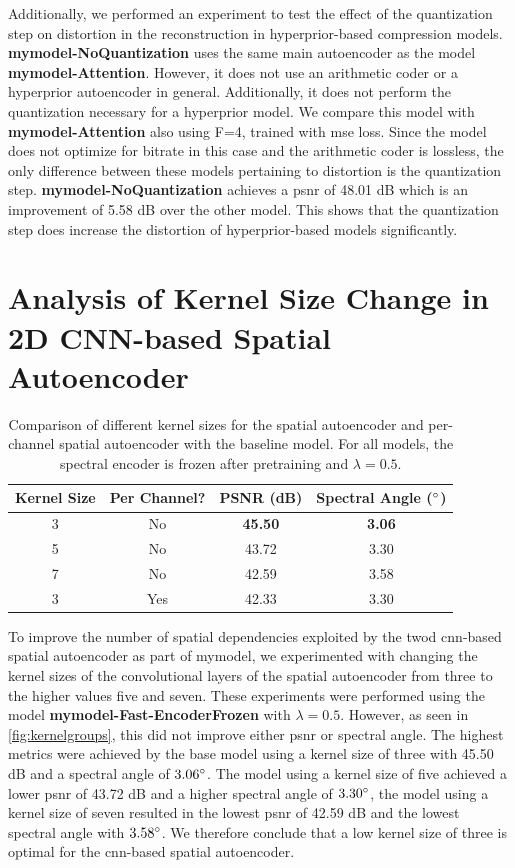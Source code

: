 Additionally, we performed an experiment to test the effect of the quantization step on distortion in the reconstruction in hyperprior-based compression models. \textbf{\ac{mymodel}-NoQuantization} uses the same main autoencoder as the model \textbf{\ac{mymodel}-Attention}. However, it does not use an arithmetic coder or a hyperprior autoencoder in general. Additionally, it does not perform the quantization necessary for a hyperprior model. We compare this model with \textbf{\ac{mymodel}-Attention} also using F=4, trained with \ac{mse} loss. Since the model does not optimize for bitrate in this case and the arithmetic coder is lossless, the only difference between these models pertaining to distortion is the quantization step. \textbf{\ac{mymodel}-NoQuantization} achieves a \ac{psnr} of 48.01 dB which is an improvement of 5.58 dB over the other model. This shows that the quantization step does increase the distortion of hyperprior-based models significantly.

\section[Analysis of Kernel Size Change]{Analysis of Kernel Size Change in 2D CNN-based Spatial Autoencoder}
\begin{table}
\centering
\caption[Kernel Size Comparison For Spatial Autoencoder]{Comparison of different kernel sizes for the spatial autoencoder and per-channel spatial autoencoder with the baseline model. For all models, the spectral encoder is frozen after pretraining and $\lambda = 0.5$.}
\begin{tabular}{|c|c|c|c|}
\hline
Kernel Size & Per Channel? & PSNR (dB) & Spectral Angle ($\degree$) \\
\hline\hline
3 & No & \textbf{45.50} & \textbf{3.06} \\
\hline
5 & No & 43.72 & 3.30 \\
\hline
7 & No & 42.59 & 3.58 \\
\hline
3 & Yes & 42.33 & 3.30 \\
\hline
\end{tabular}
\label{fig:kernelgroups}
\end{table}

To improve the number of spatial dependencies exploited by the \ac{twod} \ac{cnn}-based spatial autoencoder as part of \ac{mymodel}, we experimented with changing the kernel sizes of the convolutional layers of the spatial autoencoder from three to the higher values five and seven. These experiments were performed using the model \textbf{\ac{mymodel}-Fast-EncoderFrozen} with $\lambda=0.5$. However, as seen in \autoref{fig:kernelgroups}, this did not improve either \ac{psnr} or spectral angle. The highest metrics were achieved by the base model using a kernel size of three with 45.50 dB and a spectral angle of $3.06 \degree$. The model using a kernel size of five achieved a lower \ac{psnr} of 43.72 dB and a higher spectral angle of $3.30 \degree$, the model using a kernel size of seven resulted in the lowest \ac{psnr} of 42.59 dB and the lowest spectral angle with $3.58 \degree$. We therefore conclude that a low kernel size of three is optimal for the \ac{cnn}-based spatial autoencoder.

